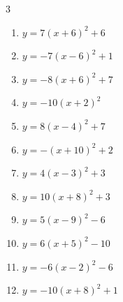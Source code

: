 \begin{multicols}{3}
\begin{enumerate}
  \item $\displaystyle y=7\left( x+6\right)^{2}+6$

        \phantom{$\displaystyle 頂点\left( -6 , 6 \right)$}

  \item $\displaystyle y=-7\left( x-6\right)^{2}+1$

        \phantom{$\displaystyle 頂点\left( 6 , 1 \right)$}

  \item $\displaystyle y=-8\left( x+6\right)^{2}+7$

        \phantom{$\displaystyle 頂点\left( -6 , 7 \right)$}

  \item $\displaystyle y=-10\left( x+2\right)^{2}$

        \phantom{$\displaystyle 頂点\left( -2 , 0 \right)$}

  \item $\displaystyle y=8\left( x-4\right)^{2}+7$

        \phantom{$\displaystyle 頂点\left( 4 , 7 \right)$}

  \item $\displaystyle y=-\left( x+10\right)^{2}+2$

        \phantom{$\displaystyle 頂点\left( -10 , 2 \right)$}

  \item $\displaystyle y=4\left( x-3\right)^{2}+3$

        \phantom{$\displaystyle 頂点\left( 3 , 3 \right)$}

  \item $\displaystyle y=10\left( x+8\right)^{2}+3$

        \phantom{$\displaystyle 頂点\left( -8 , 3 \right)$}

  \item $\displaystyle y=5\left( x-9\right)^{2}-6$

        \phantom{$\displaystyle 頂点\left( 9 , -6 \right)$}

  \item $\displaystyle y=6\left( x+5\right)^{2}-10$

        \phantom{$\displaystyle 頂点\left( -5 , -10 \right)$}

  \item $\displaystyle y=-6\left( x-2\right)^{2}-6$

        \phantom{$\displaystyle 頂点\left( 2 , -6 \right)$}

  \item $\displaystyle y=-10\left( x+8\right)^{2}+1$


\end{enumerate}
\end{multicols}
